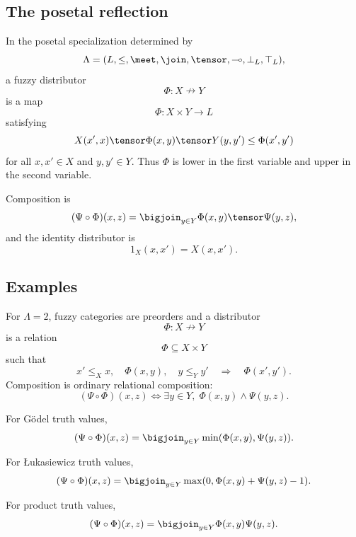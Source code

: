 \subsection{The posetal reflection}
\label{subsec:fuzzy-distributors-posetal}

In the posetal specialization determined by
\[
    \Lambda=(L,\leq,\meet,\join,\tensor,\multimap,\bot_L,\top_L),
\]
a fuzzy distributor
\[
    \Phi:X\nrightarrow Y
\]
is a map
\[
    \Phi:X\times Y\to L
\]
satisfying
\[
    X(x',x)\tensor \Phi(x,y)\tensor Y(y,y')
    \leq
    \Phi(x',y')
\]
for all \(x,x'\in X\) and \(y,y'\in Y\). Thus \(\Phi\) is lower in the first
variable and upper in the second variable.

Composition is
\[
    (\Psi\circ\Phi)(x,z)
    =
    \bigjoin_{y\in Y}
    \Phi(x,y)\tensor\Psi(y,z),
\]
and the identity distributor is
\[
    1_X(x,x')=X(x,x').
\]

\subsection{Examples}
\label{subsec:fuzzy-distributors-examples}

\begin{example}
\label{ex:fuzzy-distributors-crisp}
For \(\Lambda=2\), fuzzy categories are preorders and a distributor
\[
    \Phi:X\nrightarrow Y
\]
is a relation
\[
    \Phi\subseteq X\times Y
\]
such that
\[
    x'\leq_X x,\quad \Phi(x,y),\quad y\leq_Y y'
    \quad\Longrightarrow\quad
    \Phi(x',y').
\]
Composition is ordinary relational composition:
\[
    (\Psi\circ\Phi)(x,z)
    \Longleftrightarrow
    \exists y\in Y,\; \Phi(x,y)\wedge \Psi(y,z).
\]
\end{example}

\begin{example}
\label{ex:fuzzy-distributors-godel}
For G\"odel truth values,
\[
    (\Psi\circ\Phi)(x,z)
    =
    \bigjoin_{y\in Y}
    \min(\Phi(x,y),\Psi(y,z)).
\]
\end{example}

\begin{example}
\label{ex:fuzzy-distributors-lukasiewicz}
For {\L}ukasiewicz truth values,
\[
    (\Psi\circ\Phi)(x,z)
    =
    \bigjoin_{y\in Y}
    \max(0,\Phi(x,y)+\Psi(y,z)-1).
\]
\end{example}

\begin{example}
\label{ex:fuzzy-distributors-product}
For product truth values,
\[
    (\Psi\circ\Phi)(x,z)
    =
    \bigjoin_{y\in Y}
    \Phi(x,y)\Psi(y,z).
\]
\end{example}

